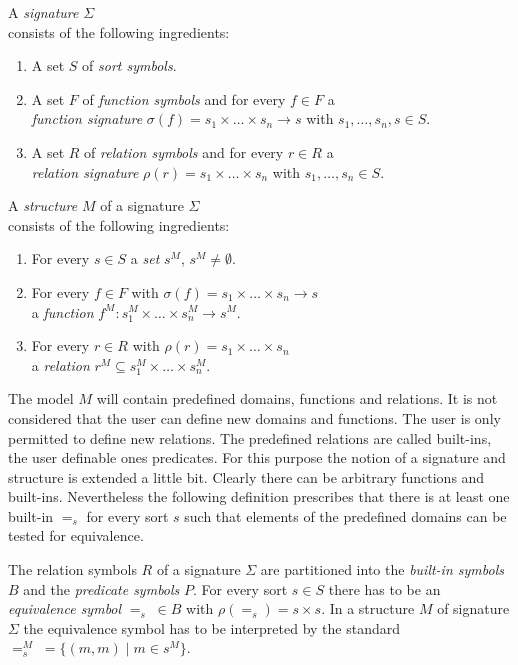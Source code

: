 \begin{Def} A {\em signature} $\Sigma$ \\
consists of the following ingredients: 
\begin{enumerate}
\item A set $S$ of {\em sort symbols}. 
\item A set $F$ of {\em function symbols} and for every $f \in F$ a \\ {\em function signature} 
$\sigma(f)=s_1 \times \ldots \times s_n \rightarrow s$ with $s_1, \ldots, s_n, s \in S$. 
\item A set $R$ of {\em relation symbols} and for every $r \in R$ a \\ {\em relation signature} 
$\rho(r)=s_1 \times \ldots \times s_n$ with $s_1, \ldots, s_n \in S$.
\end{enumerate}
\end{Def}

\begin{Def} A {\em structure} $M$ of a signature $\Sigma$ \\
consists of the following ingredients:
\begin{enumerate}
\item For every $s \in S$ a {\em set} $s^M$, $s^M \not= \emptyset$. 
\item For every $f \in F$ with $\sigma(f)=s_1 \times \ldots \times s_n \rightarrow s$ \\
a {\em function} $f^M : s_1^M \times \ldots \times s_n^M \rightarrow s^M$.
\item For every $r \in R$ with $\rho(r)=s_1\times \ldots \times s_n$ \\
a {\em relation} $r^M \subseteq s_1^M \times \ldots \times s_n^M$.
\end{enumerate}
\end{Def}

The model $M$ will contain predefined domains, functions and relations. It is not considered
that the user can define new domains and functions. The user is only permitted to define new 
relations. The predefined relations are called built-ins, the user definable ones predicates. For 
this purpose the notion of a signature and structure is extended a little bit. Clearly there can
be arbitrary functions and built-ins. Nevertheless the following definition prescribes that there
is at least one built-in $=_s$ for every sort $s$ such that elements of the predefined domains
can be tested for equivalence.

\begin{Def} The relation symbols $R$ of a signature $\Sigma$ are partitioned into the {\em 
built-in symbols} $B$ and the {\em predicate symbols} $P$. For every sort $s \in S$ there has to 
be an {\em equivalence symbol} $=_s\;\in B$ with $\rho(=_s)=s \times s$. In a structure $M$ of 
signature $\Sigma$ the equivalence symbol has to be interpreted by the standard $=_s^M\;= 
\{ (m,m) \; | \; m \in  s^M \}$.
\end{Def}

